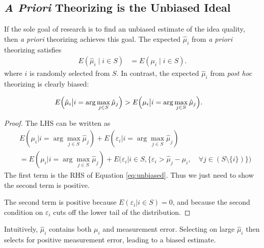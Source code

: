 \documentclass[12pt,english]{article}
\theoremstyle{plain}
\theoremstyle{plain}
\begin{document}
\subsection{\emph{A Priori} Theorizing is the Unbiased Ideal}

If the sole goal of research is to find an unbiased estimate of the idea quality, then \emph{a priori} theorizing achieves this goal.  The expected $\hat{\mu}_{i}$ from \emph{a priori} theorizing satisfies
\begin{align}
E\left(\hat{\mu}_{i}\mid i\in S \right) &= E\left(\mu_{i}\mid i\in S \right).
\label{eq:unbiased}
\end{align}
where $i$ is randomly selected from $S$. In contrast, the expected $\hat{\mu}_{i}$ from \emph{post hoc} theorizing is clearly biased:
\begin{lemma}\label{lem:ez:biased}
    \begin{align}
        E\Bigl(\hat{\mu}_{i}\big|i=\arg\max_{j\in S }\hat{\mu}_{j}\Bigr) & >E\Bigl(\mu_{i}\big|i=\arg\max_{j\in S }\hat{\mu}_{j}\Bigr).
        \label{eq:biased}
    \end{align}            
\end{lemma}
\begin{proof}
    The LHS can be written as 
    \begin{align*}
        &E\left(\mu_i \big| i = \arg\max_{j \in S} \hat{\mu}_j\right) 
        +
        E\left(\varepsilon_i \big| i = \arg\max_{j \in S} \hat{\mu}_j\right) \\        
        &= E\left(\mu_i \big| i = \arg\max_{j \in S} \hat{\mu}_j\right) 
        +
        E\bigg(\varepsilon_i
        \big|
        i \in S,
        \{
         \varepsilon_i 
        > \hat{\mu}_j - \mu_i
        , \quad
         \forall j \in \left( S\setminus\{i\}
         \right)
         \}
         \bigg)
    \end{align*}
The first term is the RHS of Equation \eqref{eq:unbiased}. Thus we just need to show the second term is positive.

The second term is positive because $E\left(\varepsilon_i\big| i \in S\right) = 0$, and because the second condition on $\varepsilon_i$  cuts off the lower tail of the distribution.
\end{proof}


Intuitively, $\hat{\mu}_{i}$ contains both $\mu_{i}$ and measurement error. Selecting on large $\hat{\mu}_{i}$ then selects for positive measurement error, leading to a biased estimate.
\end{document}
